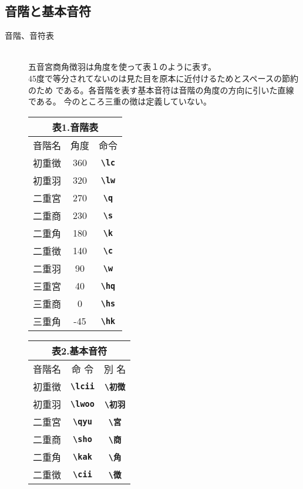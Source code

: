 \documentclass[a4paper,luatex]{l3doc}
\begin{document}
\subsection{音階と基本音符}
\begin{description}
 \item[音階、音符表]{　}\\
五音宮商角徴羽は角度を使って表１のように表す。\\
45度で等分されてないのは見た目を原本に近付けるためとスペースの節約のため
である。各音階を表す基本音符は音階の角度の方向に引いた直線である。
今のところ三重の徴は定義していない。

\begin{tabular}[t]{|c|c|c|}
\multicolumn{3}{c}{表1.{\bf 音階表}}\\\hline
 音階名&角度 &命令 \\\hline\hline
 初重徴&360 &{\bf \verb|\lc|} \\\hline
 初重羽&320 &{\bf \verb|\lw|} \\\hline
 二重宮&270 &{\bf \verb|\q|} \\\hline
 二重商&230 &{\bf \verb|\s|} \\\hline
 二重角&180 &{\bf \verb|\k|} \\\hline
 二重徴&140 &{\bf \verb|\c|} \\\hline
 二重羽&90 &{\bf \verb|\w|} \\\hline
 三重宮&40 &{\bf \verb|\hq|} \\\hline
 三重商&0 &{\bf \verb|\hs|} \\\hline
 三重角&-45 &{\bf \verb|\hk|} \\\hline
\end{tabular}
\ifluatex \hspace{2\zw}
\else \hspace{2zw}
\fi
\begin{tabular}[t]{|c|c|c|}
\multicolumn{3}{c}{表2.{\bf 基本音符}}\\\hline
音階名&命 令&別 名\\\hline\hline
初重徴 & {\bf \verb|\lcii|} & {\bf \verb|\初徴|} \\\hline
初重羽&{\bf \verb|\lwoo|}&{\bf \verb|\初羽|} \\\hline
二重宮&{\bf \verb|\qyu|}&{\bf \verb|\宮|} \\\hline
二重商&{\bf \verb|\sho|}&{\bf \verb|\商|} \\\hline
二重角&{\bf \verb|\kak|}&{\bf \verb|\角|} \\\hline
二重徴&{\bf \verb|\cii|}&{\bf \verb|\徴|} \\\hline

\end{tabular}
\end{description}
\end{document}
